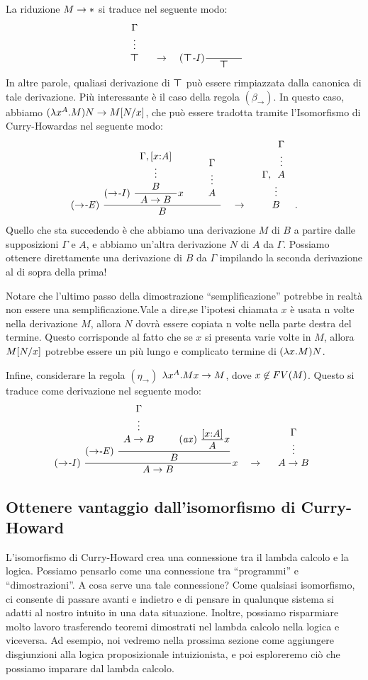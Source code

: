 \documentclass{article}
\begin{document}
La riduzione $M\to{*}$ si traduce nel seguente modo:
\[
\ideriv{\Gamma}{\ctrue} \ssep\to\ssep \trule{$\ctrue$-I}\deriv{\hspace{.5in}}{\ctrue}
\]
In altre parole, qualiasi derivazione di $\textrm{\rm\boldmath $\top$}$ pu\`o essere rimpiazzata dalla canonica di tale derivazione.
Pi\`u interessante \`e il caso della regola $(\beta_{\to})$. In questo caso, abbiamo
$(\lambda x^{A}.M)N \to M[N/x]$, che pu\`o essere tradotta tramite
l'Isomorfismo di Curry-Howardas nel seguente modo:
\[
\trule{$\to$-E}\ \deriv{\trule{$\to$-I}\ 
	\deriv{\ideriv{\Gamma,[\typ{x}{A}]}{B}}{A\to B} x
	\sep\ideriv{\Gamma}{A}}{B}
\ssep\to \ssep 
\ideriv{\Gamma,\ideriv{\Gamma}{A}}{B}.
\]
Quello che sta succedendo \`e che abbiamo una derivazione $M$ di $B$ a partire
dalle supposizioni $\Gamma$ e $A$, e abbiamo un'altra derivazione $N$ di
$A$ da $\Gamma$. Possiamo ottenere direttamente una derivazione di $B$ da
$\Gamma$ impilando la seconda derivazione al di sopra della prima!

Notare che l'ultimo passo della dimostrazione ``semplificazione''  potrebbe in realt\`a 
non essere una semplificazione.Vale a dire,se l'ipotesi chiamata $x$ \`e usata
n volte nella derivazione $M$, allora $N$ dovr\`a essere copiata n volte
nella parte destra del termine. Questo corrisponde al fatto che se
$x$ si presenta varie volte in $M$, allora $M[N/x]$ potrebbe essere
un pi\`u lungo e complicato termine di $(\lambda x.M)N$.

Infine, considerare la regola $(\eta_{\to})$  $\lambda x^{A}.Mx \to M$,
dove $x\not\in FV(M)$. Questo si traduce come derivazione nel seguente modo:
\[
\trule{$\to$-I}\ \deriv{\trule{$\to$-E}\ \deriv{\ideriv{\Gamma}{A\to
			B}\sep\trule{ax}\ \deriv{[\typ{x}{A}]}{A} x}{B}}{A\to B} x
\ssep\to\ssep \ideriv{\Gamma}{A\to B}
\]

\subsection{Ottenere vantaggio dall'isomorfismo di Curry-Howard}

L'isomorfismo di Curry-Howard crea una connessione tra il lambda
calcolo e la logica. Possiamo pensarlo come una connessione tra
``programmi'' e ``dimostrazioni''. A cosa serve una tale connessione? Come qualsiasi
isomorfismo,  ci consente di passare avanti e indietro e di pensare in
qualunque sistema si adatti al nostro intuito in una data situazione.  Inoltre,
possiamo risparmiare molto lavoro trasferendo teoremi dimostrati
nel lambda calcolo nella logica e viceversa. Ad esempio, noi
vedremo nella prossima sezione come aggiungere disgiunzioni alla logica proposizionale
intuizionista, e poi esploreremo ci\`o che possiamo imparare
dal lambda calcolo.
\end{document}
